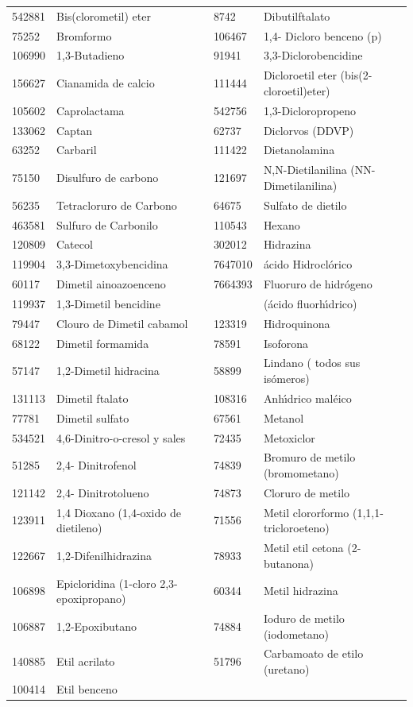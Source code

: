 \begin{table}[!htbp]
\begin{scriptsize}
\begin{supertabular}{| p{0.10\textwidth}p{0.35\textwidth}p{0.10\textwidth}p{0.35\textwidth} |}
542881& Bis(clorometil) eter &8742&Dibutilftalato\\
75252 & Bromformo &106467&1,4- Dicloro benceno (p) \\
106990 &1,3-Butadieno &91941& 3,3-Diclorobencidine \\
156627 & Cianamida de calcio &111444&Dicloroetil eter (bis(2-cloroetil)eter)\\
105602& Caprolactama& 542756 &1,3-Dicloropropeno\\ 
133062 & Captan & 62737 & Diclorvos (DDVP)\\
63252 & Carbaril &111422& Dietanolamina\\
75150 & Disulfuro de carbono & 121697 & N,N-Dietilanilina (NN-Dimetilanilina) \\
56235 & Tetracloruro de Carbono &64675&Sulfato de dietilo\\
463581 & Sulfuro de Carbonilo  &110543&Hexano\\
120809 & Catecol & 302012&Hidrazina \\
119904 & 3,3-Dimetoxybencidina &7647010&  \'acido Hidrocl\'orico\\
60117 & Dimetil ainoazoenceno&7664393& Fluoruro de hidr\'ogeno\\
119937 & 1,3-Dimetil bencidine & &(\'acido fluorh\'{\i}drico)\\
79447 & Clouro de Dimetil cabamol&123319&Hidroquinona\\
  68122 & Dimetil formamida &78591&Isoforona\\
  57147 & 1,2-Dimetil hidracina & 58899&Lindano ( todos sus is\'omeros) \\
  131113&  Dimetil ftalato &108316&Anh\'{\i}drico mal\'eico \\
  77781 &Dimetil sulfato &67561&Metanol \\
  534521& 4,6-Dinitro-o-cresol y sales & 72435&Metoxiclor \\
  51285 & 2,4- Dinitrofenol & 74839 & Bromuro de metilo (bromometano)\\
  121142 & 2,4- Dinitrotolueno & 74873& Cloruro de metilo \\
  123911 & 1,4 Dioxano (1,4-oxido de dietileno) &71556&Metil clororformo (1,1,1-tricloroeteno)\\
  122667 & 1,2-Difenilhidrazina &78933&Metil etil cetona (2-butanona) \\
  106898 & Epicloridina (1-cloro 2,3-epoxipropano)&60344 &Metil hidrazina\\
  106887 & 1,2-Epoxibutano &74884&Ioduro de metilo (iodometano)\\
  140885 & Etil acrilato &51796 &Carbamoato de etilo (uretano) \\
  100414 & Etil benceno &  &\\\hline
\end{supertabular}
\end{scriptsize}
\label{airtox}
\end{table}%


